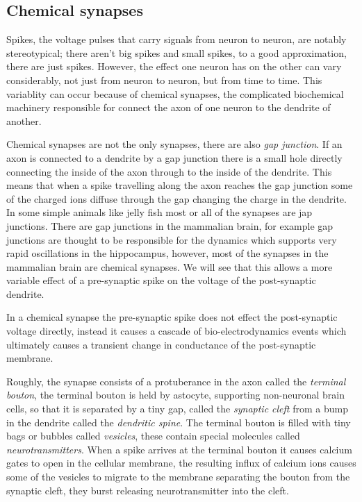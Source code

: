 \documentclass[11pt,a4paper]{scrartcl}
\begin{document}
\subsection*{Chemical synapses}

Spikes, the voltage pulses that carry signals from neuron to neuron,
are notably stereotypical; there aren't big spikes and small spikes,
to a good approximation, there are just spikes. However, the effect
one neuron has on the other can vary considerably, not just from
neuron to neuron, but from time to time. This variablity can occur
because of chemical synapses, the complicated biochemical machinery
responsible for connect the axon of one neuron to the dendrite of
another. 

Chemical synapses are not the only synapses, there are also
\textsl{gap junction}. If an axon is connected to a dendrite by a gap
junction there is a small hole directly connecting the inside of the
axon through to the inside of the dendrite. This means that when a
spike travelling along the axon reaches the gap junction some of the
charged ions diffuse through the gap changing the charge in the
dendrite. In some simple animals like jelly fish most or all of the
synapses are jap junctions. There are gap junctions in the mammalian
brain, for example gap junctions are thought to be responsible for the
dynamics which supports very rapid oscillations in the
hippocampus, however, most of the synapses in the mammalian brain are
chemical synapses. We will see that this allows a more variable effect
of a pre-synaptic spike on the voltage of the post-synaptic dendrite.

In a chemical synapse the pre-synaptic spike does not effect the
post-synaptic voltage directly, instead it causes a cascade of
bio-electrodynamics events which ultimately causes a transient change
in conductance of the post-synaptic membrane. 

Roughly, the synapse consists of a protuberance in the axon called the
\textsl{terminal bouton}, the terminal bouton is held by astocyte,
supporting non-neuronal brain cells, so that it is separated by a tiny
gap, called the \textsl{synaptic cleft} from a bump in the dendrite
called the \textsl{dendritic spine}. The terminal bouton is filled
with tiny bags or bubbles called \textsl{vesicles}, these contain
special molecules called \textsl{neurotransmitters}. When a spike
arrives at the terminal bouton it causes calcium gates to open in the
cellular membrane, the resulting influx of calcium ions causes some of
the vesicles to migrate to the membrane separating the bouton from the
synaptic cleft, they burst releasing neurotransmitter into the cleft. 
\end{document}
